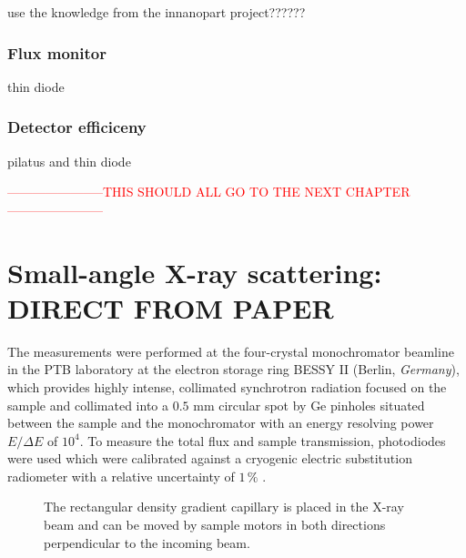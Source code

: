 use the knowledge from the innanopart project??????
\subsubsection{Flux monitor}
thin diode
\subsubsection{Detector efficiceny}
pilatus and thin diode





















\textcolor{red}{-----------------------THIS SHOULD ALL GO TO THE NEXT CHAPTER-----------------------}











\section{Small-angle X-ray scattering: DIRECT FROM PAPER}
The measurements were performed at the four-crystal monochromator beamline in the PTB laboratory at the electron storage ring BESSY II (Berlin, \emph{Germany}), which provides highly intense, collimated synchrotron radiation focused on the sample and collimated into a \(0.5\) mm circular spot by Ge pinholes situated between the sample and the monochromator with an energy resolving power \( E/\Delta E \) of \( 10^4 \). To measure the total flux and sample transmission, photodiodes were used which were calibrated against a cryogenic electric substitution radiometer with a relative uncertainty of \( 1\,\% \) \cite{krumrey_high-accuracy_2001}.


\begin{figure}%
	\centering
		
		\caption{The rectangular density gradient capillary is placed in the X-ray beam and can be moved by sample motors in both directions perpendicular to the incoming beam.}
		\label{fig:DensityGradientCapillarySetup}
\end{figure}

